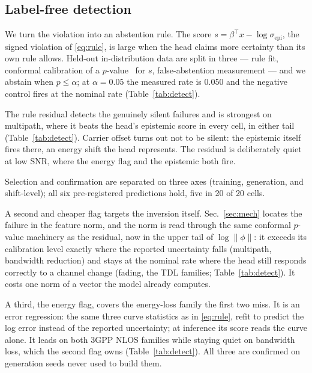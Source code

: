 \documentclass{article}
\begin{document}
\subsection{Label-free detection}
We turn the violation into an abstention rule. The score
$s=\beta^{\!\top}x-\log\sigma_{\mathrm{epi}}$, the signed violation of
\eqref{eq:rule}, is large when the head claims more certainty than its own
rule allows. Held-out in-distribution data are
split in three --- rule fit, conformal calibration of a
$p$-value~\cite{kaur2022} for $s$, false-abstention measurement --- and we
abstain when $p\le\alpha$; at $\alpha=0.05$ the measured rate is $0.050$
and the negative control fires at the nominal rate
(Table~\ref{tab:detect}).

The rule residual detects the genuinely silent failures and is strongest
on multipath, where it beats the head's epistemic score in every cell, in
either tail (Table~\ref{tab:detect}). Carrier offset turns out not to be silent: the
epistemic itself fires there, an energy shift the head represents. The
residual is deliberately quiet at low SNR, where the energy flag and the
epistemic both fire.

Selection and confirmation are separated on three axes (training,
generation, and shift-level); all six pre-registered predictions hold,
five in 20 of 20 cells.

A second and cheaper flag targets the inversion itself.
Sec.~\ref{sec:mech} locates the failure in the feature norm, and the norm
is read through the same conformal $p$-value machinery as the residual,
now in the upper tail of $\log\|\phi\|$: it exceeds its calibration level
exactly where the reported uncertainty falls (multipath, bandwidth
reduction) and stays at the nominal rate where the head still responds
correctly to a channel change (fading, the TDL families;
Table~\ref{tab:detect}). It costs one norm of a vector the model already
computes.

A third, the energy flag, covers the energy-loss family the first two
miss. It is an error regression: the same three curve statistics as in
\eqref{eq:rule}, refit to predict the log error instead of the reported
uncertainty; at inference its score reads the curve alone. It leads on both 3GPP NLOS
families while staying quiet on bandwidth loss, which the second flag
owns (Table~\ref{tab:detect}). All three are confirmed on generation
seeds never used to build them.
\end{document}
